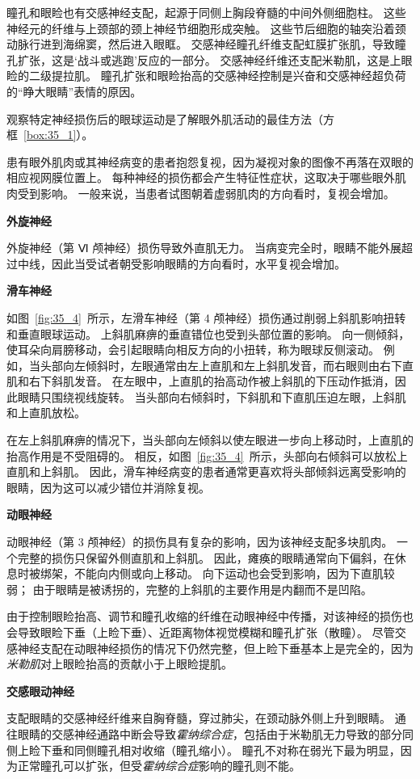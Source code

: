 瞳孔和眼睑也有交感神经支配，起源于同侧上胸段脊髓的中间外侧细胞柱。
这些神经元的纤维与上颈部的颈上神经节细胞形成突触。
这些节后细胞的轴突沿着颈动脉行进到海绵窦，然后进入眼眶。
交感神经瞳孔纤维支配虹膜扩张肌，导致瞳孔扩张，这是‘战斗或逃跑’反应的一部分。
交感神经纤维还支配米勒肌，这是上眼睑的二级提拉肌。
瞳孔扩张和眼睑抬高的交感神经控制是兴奋和交感神经超负荷的“睁大眼睛”表情的原因。



观察特定神经损伤后的眼球运动是了解眼外肌活动的最佳方法（方框~\ref{box:35_1}）。


\begin{proposition}[眼外肌肉或神经损伤] \label{box:35_1}

\quad \quad 患有眼外肌肉或其神经病变的患者抱怨复视，因为凝视对象的图像不再落在双眼的相应视网膜位置上。
每种神经的损伤都会产生特征性症状，这取决于哪些眼外肌肉受到影响。
一般来说，当患者试图朝着虚弱肌肉的方向看时，复视会增加。


\textbf{外旋神经}

\quad \quad 外旋神经（第 Ⅵ 颅神经）损伤导致外直肌无力。
当病变完全时，眼睛不能外展超过中线，因此当受试者朝受影响眼睛的方向看时，水平复视会增加。


\textbf{滑车神经}

\quad \quad 如图~\ref{fig:35_4}~所示，左滑车神经（第 4 颅神经）损伤通过削弱上斜肌影响扭转和垂直眼球运动。
上斜肌麻痹的垂直错位也受到头部位置的影响。
向一侧倾斜，使耳朵向肩膀移动，会引起眼睛向相反方向的小扭转，称为眼球反侧滚动。
例如，当头部向左倾斜时，左眼通常由左上直肌和左上斜肌发音，而右眼则由右下直肌和右下斜肌发音。
在左眼中，上直肌的抬高动作被上斜肌的下压动作抵消，因此眼睛只围绕视线旋转。
当头部向右倾斜时，下斜肌和下直肌压迫左眼，上斜肌和上直肌放松。


\quad \quad 在左上斜肌麻痹的情况下，当头部向左倾斜以使左眼进一步向上移动时，上直肌的抬高作用是不受阻碍的。
相反，如图~\ref{fig:35_4}~所示，头部向右倾斜可以放松上直肌和上斜肌。
因此，滑车神经病变的患者通常更喜欢将头部倾斜远离受影响的眼睛，因为这可以减少错位并消除复视。


\textbf{动眼神经}

\quad \quad 动眼神经（第 3 颅神经）的损伤具有复杂的影响，因为该神经支配多块肌肉。
一个完整的损伤只保留外侧直肌和上斜肌。
因此，瘫痪的眼睛通常向下偏斜，在休息时被绑架，不能向内侧或向上移动。
向下运动也会受到影响，因为下直肌较弱；
由于眼睛是被诱拐的，完整的上斜肌的主要作用是内翻而不是凹陷。


\quad \quad 由于控制眼睑抬高、调节和瞳孔收缩的纤维在动眼神经中传播，对该神经的损伤也会导致眼睑下垂（上睑下垂）、近距离物体视觉模糊和瞳孔扩张（散瞳）。
尽管交感神经支配在动眼神经损伤的情况下仍然完整，但上睑下垂基本上是完全的，因为\textit{米勒肌}对上眼睑抬高的贡献小于上眼睑提肌。


\textbf{交感眼动神经}

\quad \quad 支配眼睛的交感神经纤维来自胸脊髓，穿过肺尖，在颈动脉外侧上升到眼睛。
通往眼睛的交感神经通路中断会导致\textit{霍纳综合症}，包括由于米勒肌无力导致的部分同侧上睑下垂和同侧瞳孔相对收缩（瞳孔缩小）。
瞳孔不对称在弱光下最为明显，因为正常瞳孔可以扩张，但受\textit{霍纳综合症}影响的瞳孔则不能。
	
\end{proposition}


